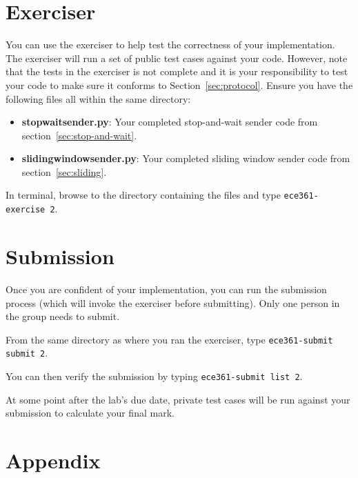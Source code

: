 \documentclass[11pt]{article}
\def\thelab{2}
\begin{document}
\section{Exerciser}
\label{sec:exercise}
You can use the exerciser to help test the correctness of your implementation. The exerciser will run a set of public test cases against your code. However, note that the tests in the exerciser is not complete and it is your responsibility to test your code to make sure it conforms to Section~\ref{sec:protocol}.
Ensure you have the following files all within the same directory:
\begin{itemize}
    \item \textbf{stopwaitsender.py}: Your completed stop-and-wait sender code from section~\ref{sec:stop-and-wait}.
    \item \textbf{slidingwindowsender.py}: Your completed sliding window sender code from section~\ref{sec:sliding}.
\end{itemize}

In terminal, browse to the directory containing the files and type \texttt{ece361-exercise \thelab}.


\section{Submission}
\label{sec:submission}
Once you are confident of your implementation, you can run the submission process (which will invoke the exerciser before submitting).
Only one person in the group needs to submit.

From the same directory as where you ran the exerciser, type \texttt{ece361-submit submit \thelab}.

You can then verify the submission by typing \texttt{ece361-submit list \thelab}.

At some point after the lab's due date, private test cases will be run against your submission to calculate your final mark.

\newpage
\appendix
\section{Appendix}
\label{sec:appendix}
\end{document}
